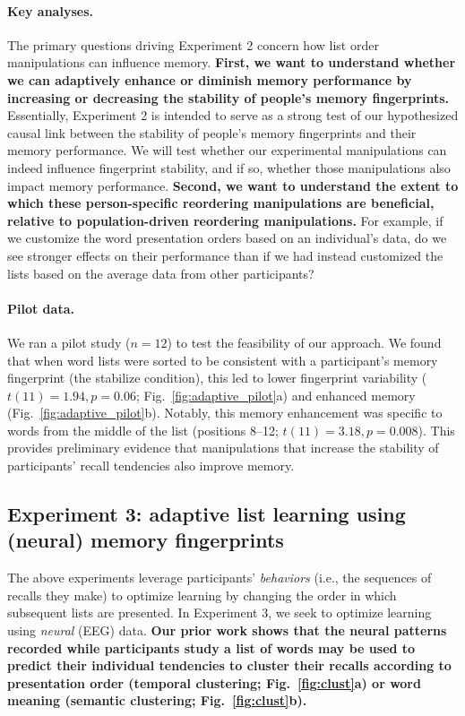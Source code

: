 \paragraph{Key analyses.}  The primary questions driving Experiment 2 concern how list order manipulations can influence memory.  \textbf{First, we want to understand whether we can adaptively enhance or diminish memory performance by increasing or decreasing the stability of people's memory fingerprints.}  Essentially, Experiment 2 is intended to serve as a strong test of our hypothesized causal link between the stability of people's memory fingerprints and their memory performance.  We will test whether our experimental manipulations can indeed influence fingerprint stability, and if so, whether those manipulations also impact memory performance.  \textbf{Second, we want to understand the extent to which these person-specific reordering manipulations are beneficial, relative to population-driven reordering manipulations.}  For example, if we customize the word presentation orders based on an individual's data, do we see stronger effects on their performance than if we had instead customized the lists based on the average data from other participants?

\paragraph{Pilot data.}  We ran a pilot study ($n = 12$) to test the feasibility of our approach.  We found that when word lists were sorted to be consistent with a participant's memory fingerprint (the stabilize condition), this led to lower fingerprint variability ($t(11) = 1.94, p = 0.06$; Fig.~\ref{fig:adaptive_pilot}a) and enhanced memory (Fig.~\ref{fig:adaptive_pilot}b).  Notably, this memory enhancement was specific to words from the middle of the list (positions 8--12; $t(11)=3.18, p=0.008$). This provides preliminary evidence that manipulations that increase the stability of participants' recall tendencies also improve memory.



\subsection*{Experiment 3: adaptive list learning using (neural) memory fingerprints}
The above experiments leverage participants' \textit{behaviors} (i.e., the sequences of recalls they make) to optimize learning by changing the order in which subsequent lists are presented.  In Experiment 3, we seek to optimize learning using \textit{neural} (EEG) data. \textbf{Our prior work shows that the neural patterns recorded while participants study a list of words may be used to predict their individual tendencies to cluster their recalls according to presentation order (temporal clustering; Fig.~\ref{fig:clust}a) or word meaning (semantic clustering; Fig.~\ref{fig:clust}b).}



